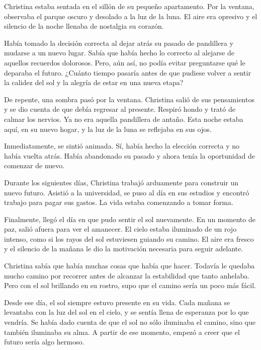 
Christina estaba sentada en el sillón de su pequeño apartamento. Por la ventana, observaba el parque oscuro y desolado a la luz de la luna. El aire era opresivo y el silencio de la noche llenaba de nostalgia su corazón.

Había tomado la decisión correcta al dejar atrás su pasado de pandillera y mudarse a un nuevo lugar. Sabía que había hecho lo correcto al alejarse de aquellos recuerdos dolorosos. Pero, aún así, no podía evitar preguntarse qué le deparaba el futuro. ¿Cuánto tiempo pasaría antes de que pudiese volver a sentir la calidez del sol y la alegría de estar en una nueva etapa?

De repente, una sombra pasó por la ventana. Christina salió de sus pensamientos y se dio cuenta de que debía regresar al presente. Respiró hondo y trató de calmar los nervios. Ya no era aquella pandillera de antaño. Esta noche estaba aquí, en su nuevo hogar, y la luz de la luna se reflejaba en sus ojos.

Inmediatamente, se sintió animada. Sí, había hecho la elección correcta y no había vuelta atrás. Había abandonado su pasado y ahora tenía la oportunidad de comenzar de nuevo.

Durante los siguientes días, Christina trabajó arduamente para construir un nuevo futuro. Asistió a la universidad, se puso al día en sus estudios y encontró trabajo para pagar sus gastos. La vida estaba comenzando a tomar forma.

Finalmente, llegó el día en que pudo sentir el sol nuevamente. En un momento de paz, salió afuera para ver el amanecer. El cielo estaba iluminado de un rojo intenso, como si los rayos del sol estuviesen guiando su camino. El aire era fresco y el silencio de la mañana le dio la motivación necesaria para seguir adelante.

Christina sabía que había muchas cosas que había que hacer. Todavía le quedaba mucho camino por recorrer antes de alcanzar la estabilidad que tanto anhelaba. Pero con el sol brillando en su rostro, supo que el camino sería un poco más fácil.

Desde ese día, el sol siempre estuvo presente en su vida. Cada mañana se levantaba con la luz del sol en el cielo, y se sentía llena de esperanza por lo que vendría. Se había dado cuenta de que el sol no sólo iluminaba el camino, sino que también iluminaba su alma. A partir de ese momento, empezó a creer que el futuro sería algo hermoso.